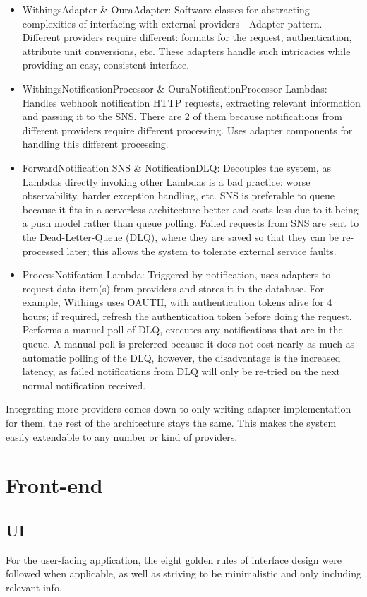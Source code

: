 \begin{itemize}
    \item {WithingsAdapter \& OuraAdapter: Software classes for abstracting complexities of interfacing with external providers - Adapter pattern. Different providers require different: formats for the request, authentication, attribute unit conversions, etc. These adapters handle such intricacies while providing an easy, consistent interface.}
    \item {WithingsNotificationProcessor \& OuraNotificationProcessor Lambdas: Handles webhook notification HTTP requests, extracting relevant information and passing it to the SNS. There are 2 of them because notifications from different providers require different processing. Uses adapter components for handling this different processing.}
    \item {ForwardNotification SNS \& NotificationDLQ: Decouples the system, as Lambdas directly invoking other Lambdas is a bad practice: worse observability, harder exception handling, etc. SNS is preferable to queue because it fits in a serverless architecture better and costs less due to it being a push model rather than queue polling. Failed requests from SNS are sent to the Dead-Letter-Queue (DLQ), where they are saved so that they can be re-processed later; this allows the system to tolerate external service faults.}
    \item {ProcessNotifcation Lambda: Triggered by notification, uses adapters to request data item(s) from providers and stores it in the database. For example, Withings uses OAUTH, with authentication tokens alive for 4 hours; if required, refresh the authentication token before doing the request. Performs a manual poll of DLQ, executes any notifications that are in the queue. A manual poll is preferred because it does not cost nearly as much as automatic polling of the DLQ, however, the disadvantage is the increased latency, as failed notifications from DLQ will only be re-tried on the next normal notification received. }
\end{itemize}
Integrating more providers comes down to only writing adapter implementation for them, the rest of the architecture stays the same. This makes the system easily extendable to any number or kind of providers.
\section{Front-end}
\subsection{UI}
For the user-facing application, the eight golden rules of interface design \cite{goldenRulesUI} were followed when applicable, as well as striving to be minimalistic and only including relevant info.
